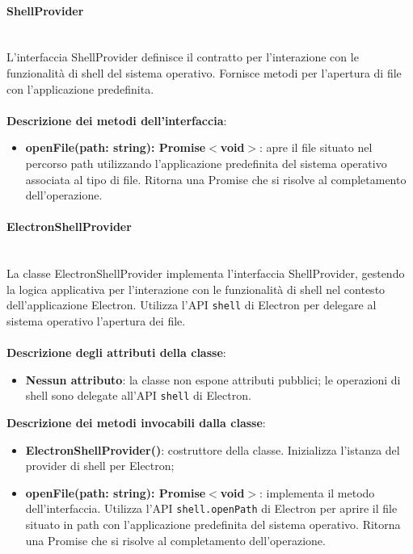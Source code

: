 \documentclass[a4paper,12pt]{article}
\begin{document}
{{{                \paragraph{ShellProvider}\label{par:ShellProvider}\mbox{}\\
                L'interfaccia ShellProvider definisce il contratto per l'interazione con le funzionalità di shell del sistema operativo. Fornisce metodi per l'apertura di file con l'applicazione predefinita.\\
                \\
                \noindent \textbf{Descrizione dei metodi dell'interfaccia}:
                \begin{itemize}
                    \item \textbf{openFile(path: string): Promise$<$void$>$}: apre il file situato nel percorso path utilizzando l'applicazione predefinita del sistema operativo associata al tipo di file. Ritorna una Promise che si risolve al completamento dell'operazione.
                \end{itemize}
                \paragraph{ElectronShellProvider}\label{par:ElectronShellProvider}\mbox{}\\
                La classe ElectronShellProvider implementa l'interfaccia ShellProvider, gestendo la logica applicativa per l'interazione con le funzionalità di shell nel contesto dell'applicazione Electron. Utilizza l'API \texttt{shell} di Electron per delegare al sistema operativo l'apertura dei file.\\
                \\
                \textbf{Descrizione degli attributi della classe}:
                \begin{itemize}
                    \item \textbf{Nessun attributo}: la classe non espone attributi pubblici; le operazioni di shell sono delegate all'API \texttt{shell} di Electron.
                \end{itemize}
                
                \noindent \textbf{Descrizione dei metodi invocabili dalla classe}:
                \begin{itemize}
                    \item \textbf{ElectronShellProvider()}: costruttore della classe. Inizializza l'istanza del provider di shell per Electron;
                    \item \textbf{openFile(path: string): Promise$<$void$>$}: implementa il metodo dell'interfaccia. Utilizza l'API \texttt{shell.openPath} di Electron per aprire il file situato in path con l'applicazione predefinita del sistema operativo. Ritorna una Promise che si risolve al completamento dell'operazione.
                \end{itemize}
            }

}}
\end{document}
